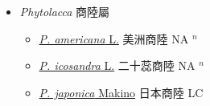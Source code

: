
  \begin{itemize}
 \item[] \textit{Phytolacca} 商陸屬
                    
  \begin{itemize}
        \item[] \href{http://www.theplantlist.org/tpl1.1/search?q=Phytolacca+americana}{\textit{P. americana} L.}   美洲商陸 NA $^n$
        \item[] \href{http://www.theplantlist.org/tpl1.1/search?q=Phytolacca+icosandra}{\textit{P. icosandra} L.}   二十蕊商陸 NA $^n$
        \item[] \href{http://www.theplantlist.org/tpl1.1/search?q=Phytolacca+japonica}{\textit{P. japonica} Makino}   日本商陸 LC
  \end{itemize}
  \end{itemize}
